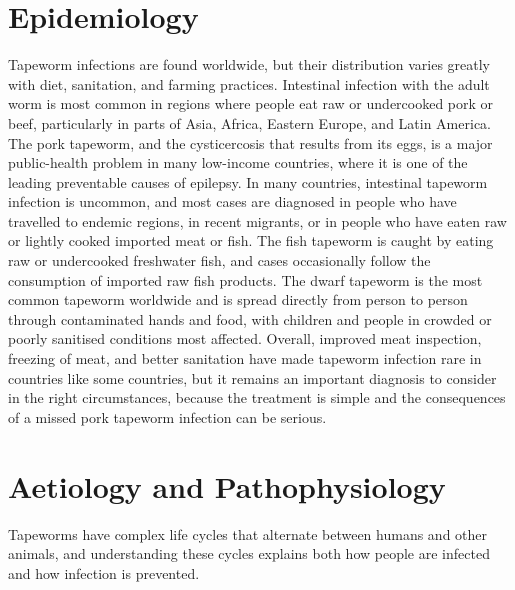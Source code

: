 \section*{Epidemiology}
Tapeworm infections are found worldwide, but their distribution varies greatly with diet, sanitation, and farming practices. Intestinal infection with the adult worm is most common in regions where people eat raw or undercooked pork or beef, particularly in parts of Asia, Africa, Eastern Europe, and Latin America. The pork tapeworm, and the cysticercosis that results from its eggs, is a major public-health problem in many low-income countries, where it is one of the leading preventable causes of epilepsy. In many countries, intestinal tapeworm infection is uncommon, and most cases are diagnosed in people who have travelled to endemic regions, in recent migrants, or in people who have eaten raw or lightly cooked imported meat or fish. The fish tapeworm is caught by eating raw or undercooked freshwater fish, and cases occasionally follow the consumption of imported raw fish products. The dwarf tapeworm is the most common tapeworm worldwide and is spread directly from person to person through contaminated hands and food, with children and people in crowded or poorly sanitised conditions most affected. Overall, improved meat inspection, freezing of meat, and better sanitation have made tapeworm infection rare in countries like some countries, but it remains an important diagnosis to consider in the right circumstances, because the treatment is simple and the consequences of a missed pork tapeworm infection can be serious.

\section*{Aetiology and Pathophysiology}
Tapeworms have complex life cycles that alternate between humans and other animals, and understanding these cycles explains both how people are infected and how infection is prevented.

